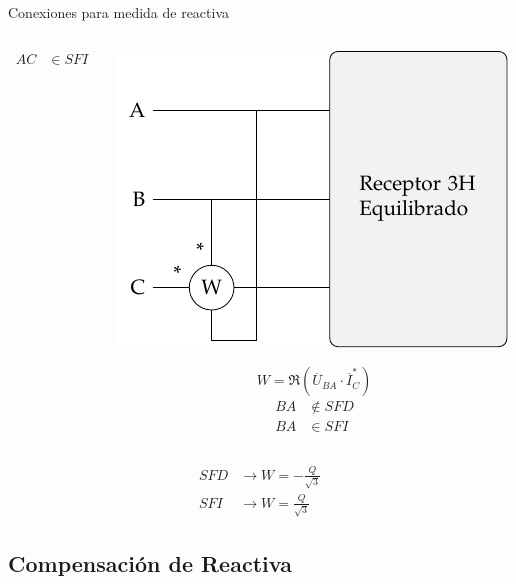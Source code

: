 \documentclass[aspectratio=169, usenames,svgnames,dvipsnames]{beamer}
\begin{document}
\begin{frame}[label={sec:orgccc77ea}]{Conexiones para medida de reactiva}
\begin{columns}
\begin{column}{0.33\columnwidth}
\begin{align*}
  AC &\in SFI
\end{align*}
\end{column}
\begin{column}{0.33\columnwidth}
\begin{center}
\includegraphics[height=0.25\textheight]{../figs/Reactiva3H_C-BA.pdf}
\end{center}
\[
  W = \Re(\overline{U}_{BA} \cdot \overline{I}_C^*)
\]
\begin{align*}
  BA &\notin SFD\\
  BA &\in SFI
\end{align*}
\end{column}
\end{columns}
\begin{align*}
SFD &\rightarrow \boxed{W = - \frac{Q}{\sqrt{3}}}\\
SFI &\rightarrow \boxed{W = \frac{Q}{\sqrt{3}}}
\end{align*}
\end{frame}


\subsection{Compensación de Reactiva}
\label{sec:orgcb15830}
\end{document}
